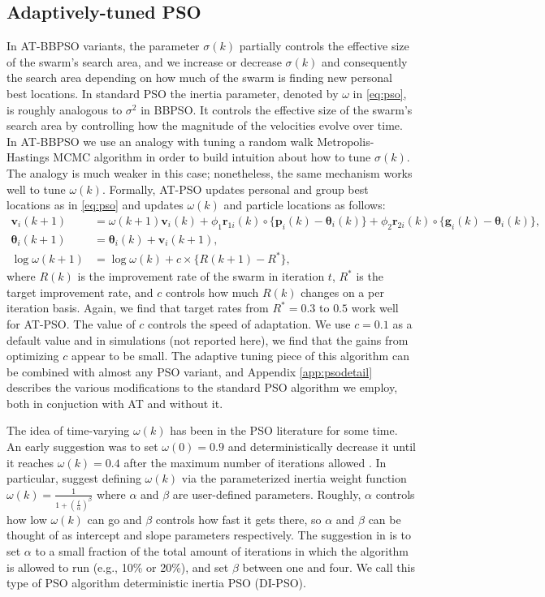 \documentclass[cmbright]{staauth}
\begin{document}
\subsection{Adaptively-tuned PSO}\label{sec:AT-PSO}
In AT-BBPSO variants, the parameter $\sigma(k)$ partially controls the effective size of the swarm's search area, and we increase or decrease $\sigma(k)$ and consequently the search area depending on how much of the swarm is finding new personal best locations. In standard PSO the inertia parameter, denoted by $\omega$ in \eqref{eq:pso}, is roughly analogous to $\sigma^2$ in BBPSO. It controls the effective size of the swarm's search area by controlling how the magnitude of the velocities evolve over time. In AT-BBPSO we use an analogy with tuning a random walk Metropolis-Hastings MCMC algorithm in order to build intuition about how to tune $\sigma(k)$. The analogy is much weaker in this case; nonetheless, the same mechanism works well to tune $\omega(k)$. Formally, AT-PSO updates personal and group best locations as in \eqref{eq:pso} and updates $\omega(k)$ and particle locations as follows:
\begin{align}\label{eq:atpso}
\bm{v}_i(k+1) &= \omega(k+1) \bm{v}_i(k) + \phi_1 \bm{r}_{1i}(k)\circ\{\bm{p}_i(k) - \bm{\theta}_i(k)\} + \phi_2 \bm{r}_{2i}(k)\circ\{\bm{g}_i(k) - \bm{\theta}_i(k)\},\nonumber\\
\bm{\theta}_i(k+1) &= \bm{\theta}_i(k) + \bm{v}_i(k+1),\nonumber\\
\log\omega(k+1)& = \log\omega(k) + c\times\{R(k+1) - R^*\},
\end{align}
where $R(k)$ is the improvement rate of the swarm in iteration $t$, $R^*$ is the target improvement rate, and $c$ controls how much $R(k)$ changes on a per iteration basis. Again, we find that target rates from $R^*=0.3$ to $0.5$ work well for AT-PSO. The value of $c$ controls the speed of adaptation. We use $c=0.1$ as a default value and in simulations (not reported here), we find that the gains from optimizing $c$ appear to be small. The adaptive tuning piece of this algorithm can be combined with almost any PSO variant, and Appendix \ref{app:psodetail} describes the various modifications to the standard PSO algorithm we employ, both in conjuction with AT and without it.

The idea of time-varying $\omega(k)$ has been in the PSO literature for some time. An early suggestion was to set $\omega(0)=0.9$ and deterministically decrease it until it reaches $\omega(k)=0.4$ after the maximum number of iterations allowed \citep{eberhart2000comparing}. In particular, \citet{tuppadung2011comparing} suggest defining $\omega(k)$ via the parameterized inertia weight function $\omega(k) = \frac{1}{1 + \left(\frac{t}{\alpha}\right)^{\beta}}$ where $\alpha$ and $\beta$ are user-defined parameters. Roughly, $\alpha$ controls how low $\omega(k)$ can go and $\beta$ controls how fast it gets there, so $\alpha$ and $\beta$ can be thought of as intercept and slope parameters respectively. The suggestion in \citet{tuppadung2011comparing} is to set $\alpha$ to a small fraction of the total amount of iterations in which the algorithm is allowed to run (e.g., 10\% or 20\%), and set $\beta$ between one and four. We call this type of PSO algorithm deterministic inertia PSO (DI-PSO).
\end{document}
